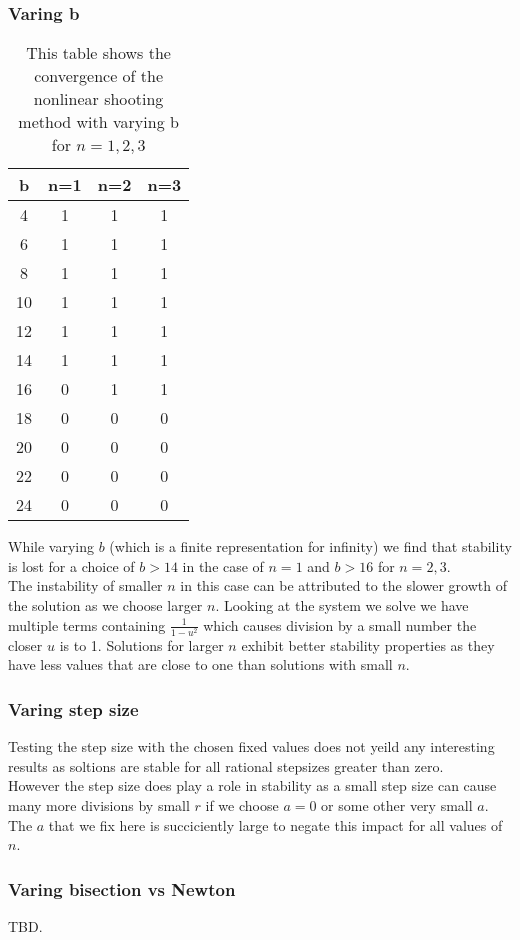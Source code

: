 \documentclass{article}
\begin{document}
\subsubsection{Varing b}
\begin{table}[H]
\centering
\begin{tabular}{|c|c|c|c|}
\hline
b & n=1 & n=2 & n=3   \\
\hline
4  & 1 & 1 & 1\\
6  & 1 & 1 & 1\\
8  & 1 & 1 & 1\\
10 & 1 & 1 & 1\\
12 & 1 & 1 & 1\\
14 & 1 & 1 & 1\\
16 & 0 & 1 & 1\\
18 & 0 & 0 & 0\\
20 & 0 & 0 & 0\\
22 & 0 & 0 & 0\\
24 & 0 & 0 & 0\\
\hline
\end{tabular}
\caption{This table shows the convergence of the nonlinear shooting method with varying b for $n=1,2,3$}
\end{table}
While varying $b$ (which is a finite representation for infinity) we find that stability is lost for a choice of $b > 14$ in the case of $n=1$ and $b>16$ for $n=2,3$. \\
The instability of smaller $n$ in this case can be attributed to the slower growth of the solution as we choose larger $n$. Looking at the system we solve we have multiple terms containing $\frac{1}{1-u^2}$ which causes division by a small number the closer $u$ is to 1. Solutions for larger $n$ exhibit better stability properties as they have less values that are close to one than solutions with small $n$. 
\subsubsection{Varing step size}
Testing the step size with the chosen fixed values does not yeild any interesting results as soltions are stable for all rational stepsizes greater than zero. \\
However the step size does play a role in stability as a small step size can cause many more divisions by small $r$ if we choose $a=0$ or some other very small $a$. The $a$ that we fix here is succiciently large to negate this impact for all values of $n$. 
\subsubsection{Varing bisection vs Newton}
TBD.
\end{document}
